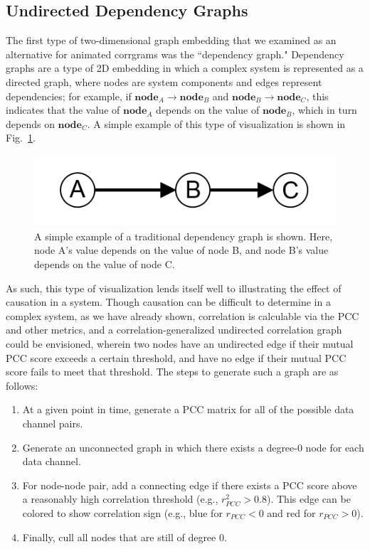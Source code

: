 \subsection{Undirected Dependency Graphs}

The first type of two-dimensional graph embedding that we examined as an alternative for animated corrgrams was the ``dependency graph." Dependency graphs are a type of 2D embedding in which a complex system is represented as a directed graph, where nodes are system components and edges represent dependencies; for example, if $\textbf{node}_{A} \rightarrow \textbf{node}_{B}$ and $\textbf{node}_{B} \rightarrow \textbf{node}_{C}$, this indicates that the value of $\textbf{node}_{A}$ depends on the value of $\textbf{node}_{B}$, which in turn depends on $\textbf{node}_{C}$. A simple example of this type of visualization is shown in Fig.~\ref{fig:dependency_graph_example}.

\begin{figure}[h]
\centering
    \includegraphics{images/dependency_graph_example.png}
    \caption{A simple example of a traditional dependency graph is shown. Here, node A's value depends on the value of node B, and node B's value depends on the value of node C.}
    \label{fig:dependency_graph_example}
\end{figure}

As such, this type of visualization lends itself well to illustrating the effect of causation in a system. Though causation can be difficult to determine in a complex system, as we have already shown, correlation is calculable via the PCC and other metrics, and a correlation-generalized undirected correlation graph could be envisioned, wherein two nodes have an undirected edge if their mutual PCC score exceeds a certain threshold, and have no edge if their mutual PCC score fails to meet that threshold. The steps to generate such a graph are as follows:

\begin{enumerate}
    \item At a given point in time, generate a PCC matrix for all of the possible data channel pairs.
    \item Generate an unconnected graph in which there exists a degree-0 node for each data channel.
    \item For node-node pair, add a connecting edge if there exists a PCC score above a reasonably high correlation threshold (e.g., $r_{PCC}^{2} > 0.8$). This edge can be colored to show correlation sign (e.g., blue for $r_{PCC} < 0$ and red for $r_{PCC} > 0$).
    \item Finally, cull all nodes that are still of degree 0.
\end{enumerate}

